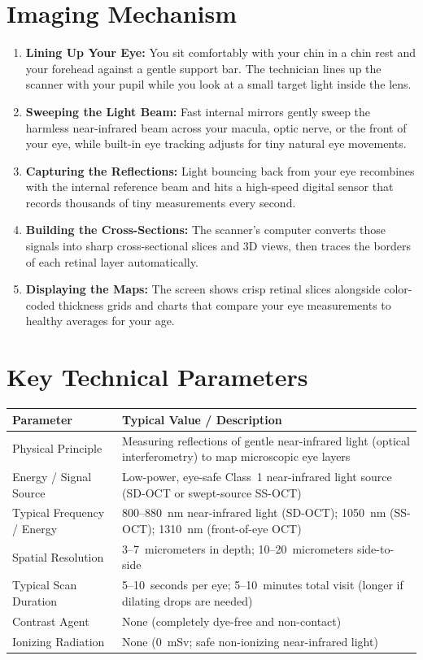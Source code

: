 \section{Imaging Mechanism}
\begin{enumerate}
\item \textbf{Lining Up Your Eye:} You sit comfortably with your chin in a chin rest and your forehead against a gentle support bar. The technician lines up the scanner with your pupil while you look at a small target light inside the lens.
\item \textbf{Sweeping the Light Beam:} Fast internal mirrors gently sweep the harmless near-infrared beam across your macula, optic nerve, or the front of your eye, while built-in eye tracking adjusts for tiny natural eye movements.
\item \textbf{Capturing the Reflections:} Light bouncing back from your eye recombines with the internal reference beam and hits a high-speed digital sensor that records thousands of tiny measurements every second.
\item \textbf{Building the Cross-Sections:} The scanner's computer converts those signals into sharp cross-sectional slices and 3D views, then traces the borders of each retinal layer automatically.
\item \textbf{Displaying the Maps:} The screen shows crisp retinal slices alongside color-coded thickness grids and charts that compare your eye measurements to healthy averages for your age.
\end{enumerate}

\section{Key Technical Parameters}
\noindent
\begin{tabularx}{\textwidth}{@{}l X@{}}
\toprule
\textbf{Parameter} & \textbf{Typical Value / Description} \\
\midrule
Physical Principle & Measuring reflections of gentle near-infrared light (optical interferometry) to map microscopic eye layers \\
Energy / Signal Source & Low-power, eye-safe Class~1 near-infrared light source (SD-OCT or swept-source SS-OCT) \\
Typical Frequency / Energy & 800--880~nm near-infrared light (SD-OCT); 1050~nm (SS-OCT); 1310~nm (front-of-eye OCT) \\
Spatial Resolution & 3--7~micrometers in depth; 10--20~micrometers side-to-side \\
Typical Scan Duration & 5--10~seconds per eye; 5--10~minutes total visit (longer if dilating drops are needed) \\
Contrast Agent & None (completely dye-free and non-contact) \\
Ionizing Radiation & None (0~mSv; safe non-ionizing near-infrared light) \\
\bottomrule
\end{tabularx}

